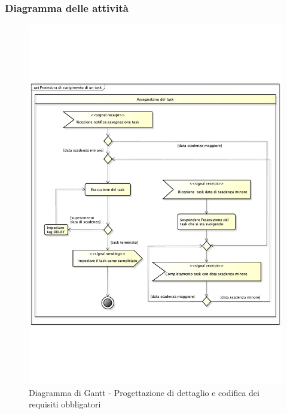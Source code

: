 		\subsubsection{Diagramma delle attività} %
		\label{ssub:diagramma_delle_attivita}
			\begin{figure}[htbp]
				\centering
				\includegraphics[width=14cm]{images/proc_svolgimento_task.pdf}
				\caption{Diagramma di Gantt - Progettazione di dettaglio e codifica dei requisiti obbligatori}
				\label{fig:gantt_prog_dett_cod_requisiti_obbligatori}				
			\end{figure}
	
